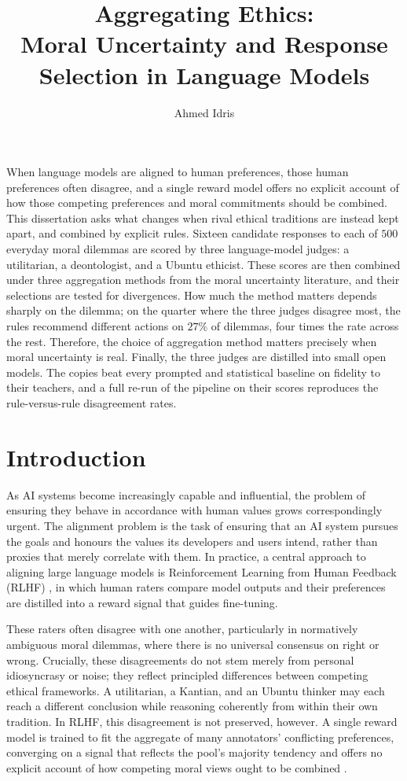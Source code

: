 \documentclass[10pt,twocolumn,a4paper]{article}
\title{\textbf{Aggregating Ethics:}\\ Moral Uncertainty and Response Selection in Language Models}
\author{Ahmed Idris}
\date{}
\let\cite\citep
\renewenvironment{abstract}{%
  \begin{center}\textbf{\large\abstractname}\end{center}%
  \vspace{2pt}%
}{\vspace{4pt}}
\begin{document}
\raggedbottom
\maketitle

\begin{abstract}
\noindent
When language models are aligned to human preferences, those human preferences often 
disagree, and a single reward model offers no explicit account of how
those competing preferences and moral commitments should be combined. This dissertation
asks what changes when rival ethical traditions are instead kept apart, 
and combined by explicit rules. Sixteen
candidate responses to each of $500$ everyday moral dilemmas are scored
by three language-model judges: a utilitarian, a deontologist, and
a Ubuntu ethicist. These scores are then combined under
three aggregation methods from the moral uncertainty literature, and their selections are tested for divergences. How much the method matters
depends sharply on the dilemma; on the quarter where the three judges
disagree most, the rules recommend different actions on $27\%$ of
dilemmas, four times the rate across the rest. 
Therefore, the choice of aggregation method matters precisely when moral
uncertainty is real. Finally, the three judges are distilled into small
open models. The copies beat every prompted and statistical baseline on
fidelity to their teachers, and a full re-run of the pipeline on their
scores reproduces the rule-versus-rule disagreement rates.
\end{abstract}

\section{Introduction}

As AI systems become increasingly capable and influential, the problem of
ensuring they behave in accordance with human values grows correspondingly
urgent. The alignment problem \cite{christian2020} is the task of ensuring
that an AI system pursues the goals and honours the values its developers
and users intend, rather than proxies that merely correlate with them. In
practice, a central approach to aligning large language models is
Reinforcement Learning from Human Feedback (RLHF)
\cite{ouyang2022,casper2023}, in
which human raters compare model outputs and their preferences are
distilled into a reward signal that guides fine-tuning.

These raters often disagree with one another, particularly in normatively
ambiguous moral dilemmas, where there is no universal consensus on right or
wrong. Crucially, these disagreements do not stem merely from personal
idiosyncrasy or noise; they reflect principled differences between
competing ethical frameworks. A utilitarian, a Kantian, and an Ubuntu
thinker may each reach a different conclusion while reasoning coherently
from within their own tradition. In RLHF, this disagreement is not
preserved, however. A single reward model is trained to fit the aggregate
of many annotators' conflicting preferences, converging on a signal that
reflects the pool's majority tendency and offers no explicit account of how
competing moral views ought to be combined \cite{casper2023}.
\end{document}
